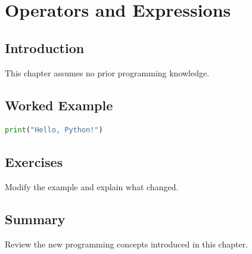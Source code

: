 \chapter{Operators and Expressions}
\label{chap:vol3-5}



\section{Introduction}
This chapter assumes no prior programming knowledge.

\section{Worked Example}
\begin{lstlisting}[language=Python]
print("Hello, Python!")
\end{lstlisting}

\section{Exercises}
\begin{exercise}
Modify the example and explain what changed.
\end{exercise}

\section{Summary}
Review the new programming concepts introduced in this chapter.

